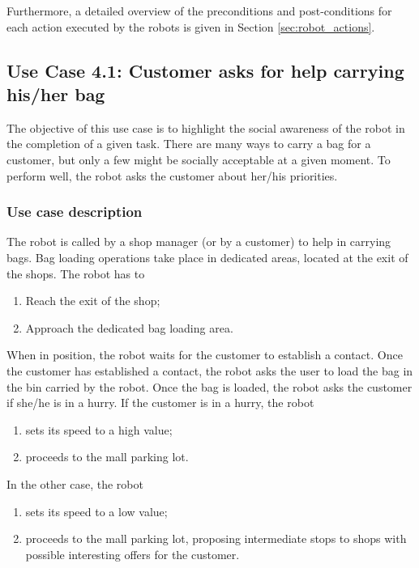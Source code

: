 Furthermore, a detailed overview of the preconditions and post-conditions for each action executed by the robots is given in Section \ref{sec:robot_actions}.


\subsection{Use Case 4.1: Customer asks for help carrying his/her bag}

The objective of this use case is to highlight the social awareness
of the robot in the completion of a given task. There are many ways
to carry a bag for a customer, but only a few might be socially acceptable
at a given moment. To perform well, the robot asks the customer about her/his priorities.

\subsubsection{Use case description}

The robot is called by a shop manager (or by a customer) to help
in carrying bags. Bag loading operations take place in dedicated areas,
located at the exit of the shops.
The robot has to
\begin{enumerate}
\item Reach the exit of the shop;
\item Approach the dedicated bag loading area.
\end{enumerate}

\noindent When in position, the robot waits for the customer to establish
a contact.
Once the customer has established a contact, the robot asks the user
to load the bag in the bin carried by the robot.
Once the bag is loaded, the robot asks the customer if she/he is in a hurry.
If the customer is in a hurry, the robot
\begin{enumerate}
\item sets its speed to a high value;
\item proceeds to the mall parking lot.
\end{enumerate}

\noindent In the other case, the robot
\begin{enumerate}
\item sets its speed to a low value;
\item proceeds to the mall parking lot, proposing intermediate stops to shops
with possible interesting offers for the customer.
\end{enumerate}

